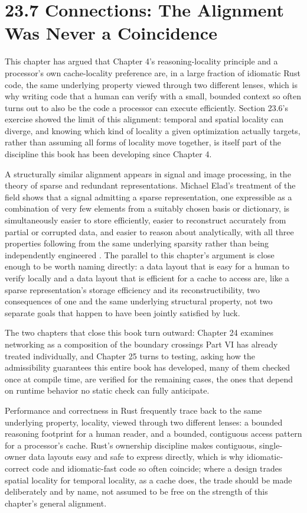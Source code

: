 \documentclass[11pt]{book}
\begin{document}
\section*{23.7 Connections: The Alignment Was Never a Coincidence}

This chapter has argued that Chapter 4's reasoning-locality principle and a processor's own cache-locality preference are, in a large fraction of idiomatic Rust code, the same underlying property viewed through two different lenses, which is why writing code that a human can verify with a small, bounded context so often turns out to also be the code a processor can execute efficiently. Section 23.6's exercise showed the limit of this alignment: temporal and spatial locality can diverge, and knowing which kind of locality a given optimization actually targets, rather than assuming all forms of locality move together, is itself part of the discipline this book has been developing since Chapter 4.

A structurally similar alignment appears in signal and image processing, in the theory of sparse and redundant representations. Michael Elad's treatment of the field shows that a signal admitting a sparse representation, one expressible as a combination of very few elements from a suitably chosen basis or dictionary, is simultaneously easier to store efficiently, easier to reconstruct accurately from partial or corrupted data, and easier to reason about analytically, with all three properties following from the same underlying sparsity rather than being independently engineered \cite{elad2010}. The parallel to this chapter's argument is close enough to be worth naming directly: a data layout that is easy for a human to verify locally and a data layout that is efficient for a cache to access are, like a sparse representation's storage efficiency and its reconstructibility, two consequences of one and the same underlying structural property, not two separate goals that happen to have been jointly satisfied by luck.

The two chapters that close this book turn outward: Chapter 24 examines networking as a composition of the boundary crossings Part VI has already treated individually, and Chapter 25 turns to testing, asking how the admissibility guarantees this entire book has developed, many of them checked once at compile time, are verified for the remaining cases, the ones that depend on runtime behavior no static check can fully anticipate.

\begin{invariantbox}
Performance and correctness in Rust frequently trace back to the same underlying property, locality, viewed through two different lenses: a bounded reasoning footprint for a human reader, and a bounded, contiguous access pattern for a processor's cache. Rust's ownership discipline makes contiguous, single-owner data layouts easy and safe to express directly, which is why idiomatic-correct code and idiomatic-fast code so often coincide; where a design trades spatial locality for temporal locality, as a cache does, the trade should be made deliberately and by name, not assumed to be free on the strength of this chapter's general alignment.
\end{invariantbox}
\end{document}
